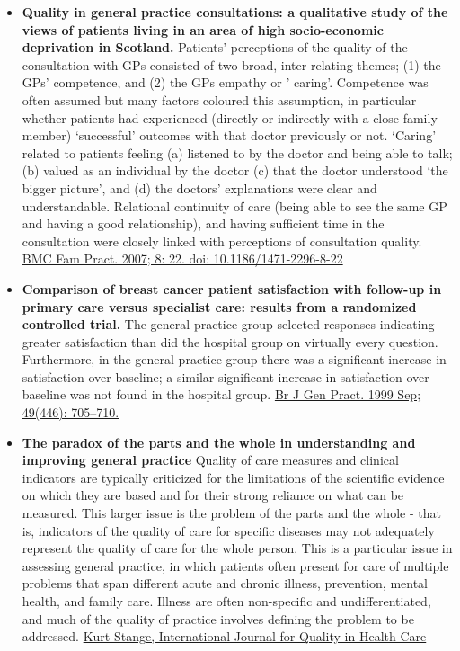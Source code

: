 \documentclass[]{book}
\begin{document}
\begin{itemize}
\item
  \textbf{Quality in general practice consultations: a qualitative study of the views of patients living in an area of high socio-economic deprivation in Scotland.} Patients' perceptions of the quality of the consultation with GPs consisted of two broad, inter-relating themes; (1) the GPs' competence, and (2) the GPs empathy or ' caring'. Competence was often assumed but many factors coloured this assumption, in particular whether patients had experienced (directly or indirectly with a close family member) `successful' outcomes with that doctor previously or not. `Caring' related to patients feeling (a) listened to by the doctor and being able to talk; (b) valued as an individual by the doctor (c) that the doctor understood `the bigger picture', and (d) the doctors' explanations were clear and understandable. Relational continuity of care (being able to see the same GP and having a good relationship), and having sufficient time in the consultation were closely linked with perceptions of consultation quality. \href{https://www.ncbi.nlm.nih.gov/pmc/articles/PMC1857696/}{BMC Fam Pract. 2007; 8: 22. doi: 10.1186/1471-2296-8-22}
\item
  \textbf{Comparison of breast cancer patient satisfaction with follow-up in primary care versus specialist care: results from a randomized controlled trial.} The general practice group selected responses indicating greater satisfaction than did the hospital group on virtually every question. Furthermore, in the general practice group there was a significant increase in satisfaction over baseline; a similar significant increase in satisfaction over baseline was not found in the hospital group. \href{https://www.ncbi.nlm.nih.gov/pmc/articles/PMC1313497/}{Br J Gen Pract. 1999 Sep; 49(446): 705--710.}
\item
  \textbf{The paradox of the parts and the whole in understanding and improving general practice} Quality of care measures and clinical indicators are typically criticized for the limitations of the scientific evidence on which they are based and for their strong reliance on what can be measured. This larger issue is the problem of the parts and the whole - that is, indicators of the quality of care for specific diseases may not adequately represent the quality of care for the whole person. This is a particular issue in assessing general practice, in which patients often present for care of multiple problems that span different acute and chronic illness, prevention, mental health, and family care. Illness are often non-specific and undifferentiated, and much of the quality of practice involves defining the problem to be addressed. \href{https://sci-hub.tw/10.1093/intqhc/14.4.267}{Kurt Stange, International Journal for Quality in Health Care}

\end{itemize}
\end{document}
